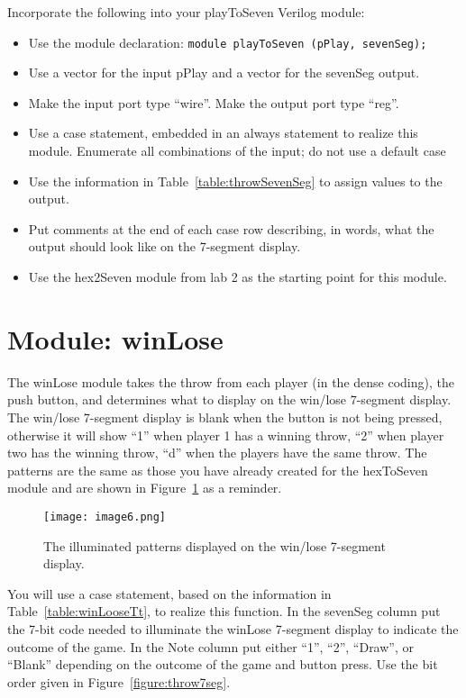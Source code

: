 \protect\hypertarget{play2Seven_Verilog}{}{}Incorporate the following
into your playToSeven Verilog module:

\begin{itemize}
    \item
        Use the module declaration: \verb+module playToSeven (pPlay, sevenSeg);+
    \item
        Use a vector for the input pPlay and a vector for the sevenSeg output.
    \item
        Make the input port type ``wire''. Make the output port type ``reg''.
    \item
        Use a case statement, embedded in an always statement to realize this
        module. Enumerate all combinations of the input; do not use a default
        case
    \item
        Use the information in Table~\ref{table:throwSevenSeg} to assign values to the output.
    \item
        Put comments at the end of each case row describing, in words, what
        the output should look like on the 7-segment display.
    \item
        Use the hex2Seven module from lab 2 as the starting point for this
        module.
\end{itemize}

\section{Module: winLose}

The winLose module takes the throw from each player (in the dense
coding), the push button, and determines what to display on the win/lose
7-segment display. The win/lose 7-segment display is blank when the
button is not being pressed, otherwise it will show ``1'' when player 1
has a winning throw, ``2'' when player two has the winning throw, ``d''
when the players have the same throw. The patterns are the same as those
you have already created for the hexToSeven module and are shown in
Figure~\ref{fig:winLose7seg} as a reminder.

\begin{figure}[ht]
    \texttt{[image:  image6.png]}
    \caption{The illuminated patterns displayed on the win/lose 7-segment display.}
    \label{fig:winLose7seg}
\end{figure}

You will use a case statement, based on the information in Table~\ref{table:winLooseTt}, to
realize this function. In the sevenSeg column put the 7-bit code needed
to illuminate the winLose 7-segment display to indicate the outcome of
the game. In the Note column put either ``1'', ``2'', ``Draw'', or
``Blank'' depending on the outcome of the game and button press. Use the
bit order given in Figure~\ref{figure:throw7seg}.

